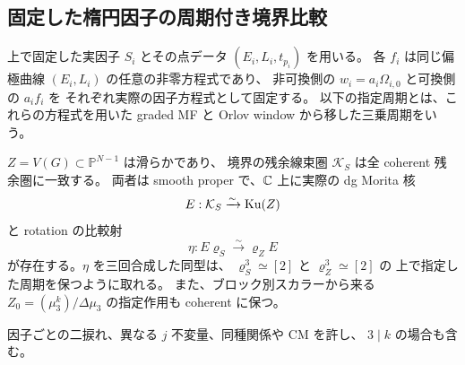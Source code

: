 \subsection{固定した楕円因子の周期付き境界比較}
\label{ebk:subsec:boundary}

上で固定した実因子 $S_i$ とその点データ
$(E_i,L_i,t_{p_i})$ を用いる。
各 $f_i$ は同じ偏極曲線 $(E_i,L_i)$ の任意の非零方程式であり、
非可換側の $w_i=a_i\Omega_{i,0}$ と可換側の $a_if_i$ を
それぞれ実際の因子方程式として固定する。
以下の指定周期とは、これらの方程式を用いた
graded MF と Orlov window から移した三乗周期をいう。

\begin{lemma}[任意の固定楕円因子に対する実境界核]
\label{ebk:lem:boundary}
$Z=V(G)\subset\mathbb P^{N-1}$ は滑らかであり、
境界の残余線束圏 $\mathcal K_S$ は全 coherent 残余圏に一致する。
両者は smooth proper で、$\mathbb C$ 上に実際の dg Morita 核
\[
 E:\mathcal K_S\xrightarrow{\sim}\operatorname{Ku}(Z)
\]
と rotation の比較射
\[
 \eta:E\varrho_S\xrightarrow{\sim}\varrho_ZE
\]
が存在する。$\eta$ を三回合成した同型は、
$\varrho_S^3\simeq[2]$ と $\varrho_Z^3\simeq[2]$ の
上で指定した周期を保つように取れる。
また、ブロック別スカラーから来る
$Z_0=(\mu_3^k)/\Delta\mu_3$ の指定作用も coherent に保つ。

因子ごとの二捩れ、異なる $j$ 不変量、同種関係や CM を許し、
$3\mid k$ の場合も含む。
\end{lemma}

